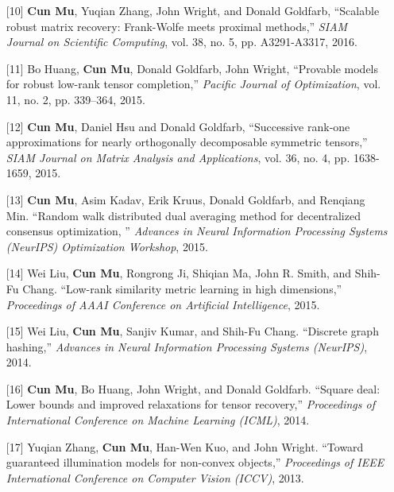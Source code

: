 \documentclass[11pt,a4paper,roman]{moderncv} %
\begin{document}
\begin{enumerate}
\vspace*{2mm}
\item[{[10]}] {\bfseries Cun Mu}, Yuqian Zhang, John Wright, and Donald Goldfarb, ``Scalable robust matrix recovery: Frank-Wolfe meets proximal methods,'' {\em SIAM Journal on Scientific Computing}, vol. 38, no. 5, pp.  A3291-A3317, 2016. 
\vspace*{2mm}
\item[{[11]}] Bo Huang, {\bfseries Cun Mu}, Donald Goldfarb, John Wright, ``Provable models for robust low-rank tensor completion,'' {\em Pacific Journal of Optimization}, vol. 11,  no. 2, pp. 339--364, 2015.
\vspace*{2mm}
\item[{[12]}] {\bfseries Cun Mu}, Daniel Hsu and Donald Goldfarb, ``Successive rank-one approximations for nearly orthogonally decomposable symmetric tensors,'' {\em SIAM Journal on Matrix Analysis and Applications}, vol. 36, no. 4, pp. 1638-1659, 2015.
\vspace*{2mm}
\item[{[13]}] {\bfseries Cun Mu}, Asim Kadav, Erik Kruus, Donald Goldfarb, and Renqiang Min. ``Random walk distributed dual averaging method for decentralized consensus optimization, '' {\em Advances in Neural Information Processing Systems (NeurIPS) Optimization Workshop}, 2015.
\vspace*{2mm}
\item[{[14]}] Wei Liu, {\bfseries Cun Mu}, Rongrong Ji, Shiqian Ma, John R. Smith, and Shih-Fu Chang.  ``Low-rank similarity metric learning in high dimensions,'' {\em Proceedings of AAAI Conference on Artificial Intelligence}, 2015. 
\vspace*{2mm}
\item[{[15]}] Wei Liu, {\bfseries Cun Mu}, Sanjiv Kumar, and Shih-Fu Chang. ``Discrete graph hashing,'' {\em Advances in Neural Information Processing Systems (NeurIPS)}, 2014.
\vspace*{2mm}
 \item[{[16]}] {\bfseries Cun Mu}, Bo Huang, John Wright, and Donald Goldfarb.  ``Square deal: Lower bounds and improved relaxations for tensor recovery,'' {\em Proceedings of International Conference on Machine Learning (ICML)}, 2014.
 \vspace*{2mm}
\item[{[17]}] {Yuqian Zhang}, {\bfseries Cun Mu}, Han-Wen Kuo, and John Wright. ``Toward guaranteed illumination models for non-convex objects,'' {\em Proceedings of IEEE International Conference on Computer Vision (ICCV)}, 2013.


\end{enumerate}
\end{document}
